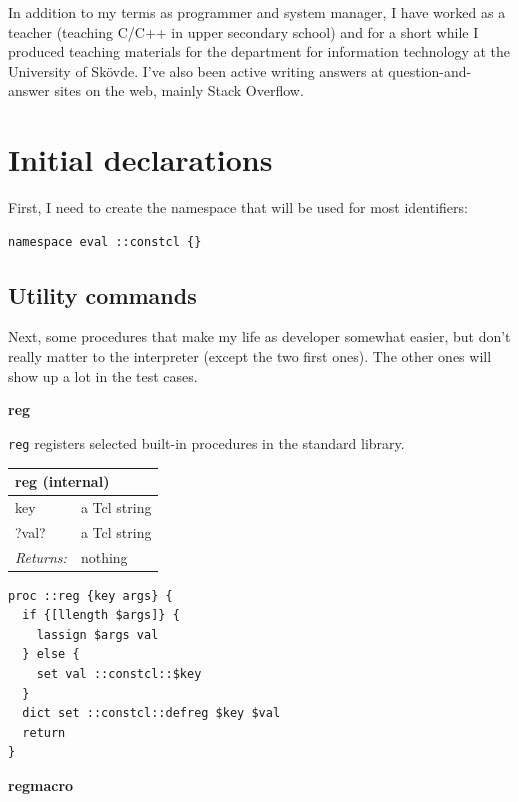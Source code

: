 \documentclass[twoside,9pt]{report}
\begin{document}
In addition to my terms as programmer and system manager, I have worked as a teacher (teaching C/C++ in upper secondary school) and for a short while I produced teaching materials for the department for information technology at the University of Skövde. I've also been active writing answers at question-and-answer sites on the web, mainly Stack Overflow.

\chapter{Initial declarations}
\label{initial-declarations}

First, I need to create the namespace that will be used for most identifiers:

\noindent\makebox[\linewidth]{\rule{\linewidth}{0.4pt}}
\begin{lstlisting}
namespace eval ::constcl {}
\end{lstlisting}
\noindent\makebox[\linewidth]{\rule{\linewidth}{0.4pt}}
\section{Utility commands}
\label{utility-commands}

Next, some procedures that make my life as developer somewhat easier, but don't really matter to the interpreter (except the two first ones). The other ones will show up a lot in the test cases.


\textbf{reg}


\texttt{reg} registers selected built-in procedures in the standard library.

\begin{tabular}{ |l l| }
\hline
\multicolumn{2}{|l|}{reg (internal)} \\
\hline
key & a Tcl string \\
?val? & a Tcl string \\
\textit{Returns:} & nothing \\
\hline
\end{tabular}

\noindent\makebox[\linewidth]{\rule{\linewidth}{0.4pt}}
\begin{lstlisting}
proc ::reg {key args} {
  if {[llength $args]} {
    lassign $args val
  } else {
    set val ::constcl::$key
  }
  dict set ::constcl::defreg $key $val
  return
}
\end{lstlisting}
\noindent\makebox[\linewidth]{\rule{\linewidth}{0.4pt}}

\textbf{regmacro}
\end{document}
